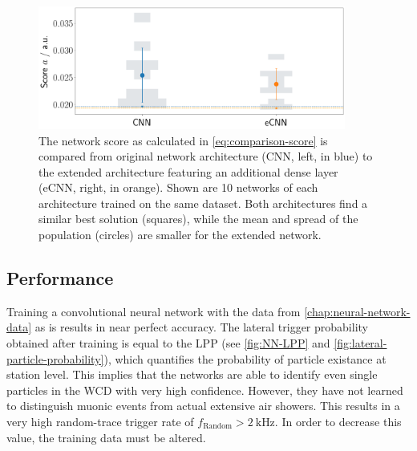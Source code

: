 
\begin{figure}
	\centering
	\includegraphics[width=0.9\textwidth]{./plots/CNN_vs_eCNN.png}
	\caption{The network score as calculated in \autoref{eq:comparison-score} is compared from original network architecture (CNN, left, in blue) to the extended
	architecture featuring an additional dense layer (eCNN, right, in orange). Shown are 10 networks of each architecture trained on the same dataset. Both
	architectures find a similar best solution (squares), while the mean and spread of the population (circles) are smaller for the extended network.}
	\label{fig:cnn-vs-ecnn}
\end{figure}

\subsection{Performance}

Training a convolutional neural network with the data from \autoref{chap:neural-network-data} as is results in near perfect accuracy. The lateral trigger 
probability obtained after training is equal to the LPP (see \autoref{fig:NN-LPP} and \autoref{fig:lateral-particle-probability}), which quantifies the probability
of particle existance at station level. This implies that the networks are able to identify even single particles in the WCD with very high confidence. However, 
they have not learned to distinguish muonic events from actual extensive air showers. This results in a very high random-trace trigger rate of 
$f_\text{Random} > \SI{2}{\kilo\hertz}$. In order to decrease this value, the training data must be altered.

